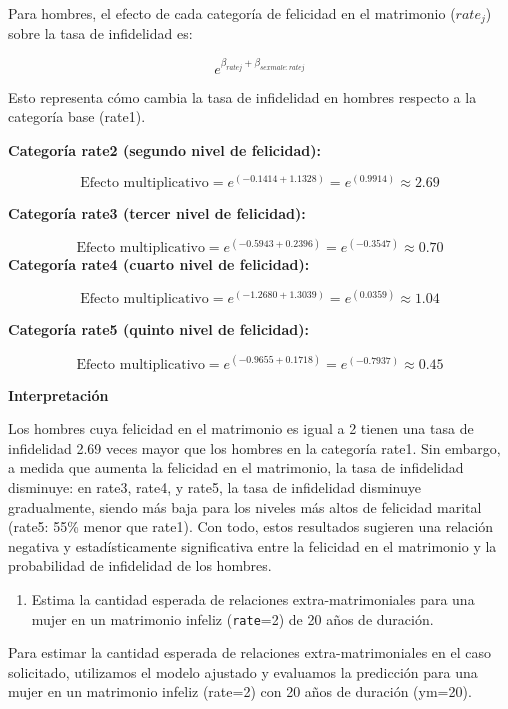 \documentclass[
  12pt,
  a4paper,
]{article}
\providecommand{\tightlist}{%
  \setlength{\itemsep}{0pt}\setlength{\parskip}{0pt}}
\begin{document}
Para hombres, el efecto de cada categoría de felicidad en el matrimonio (\(rate_j\)) sobre la tasa de infidelidad es:

\[
e^{\beta_{ratej}+\beta_{sexmale:ratej}}
\]

Esto representa cómo cambia la tasa de infidelidad en hombres respecto a la categoría base (rate1).

\textbf{Categoría rate2 (segundo nivel de felicidad):}

\[
\text{Efecto multiplicativo} = e^{(-0.1414+1.1328)} = e^{(0.9914)} \approx 2.69
\]

\textbf{Categoría rate3 (tercer nivel de felicidad):}

\[
\text{Efecto multiplicativo} = e^{(-0.5943+0.2396)} = e^{(-0.3547)} \approx 0.70
\]
\textbf{Categoría rate4 (cuarto nivel de felicidad):}

\[
\text{Efecto multiplicativo} = e^{(-1.2680+1.3039)} = e^{(0.0359)} \approx 1.04
\]

\textbf{Categoría rate5 (quinto nivel de felicidad):}

\[
\text{Efecto multiplicativo} = e^{(-0.9655+0.1718)} = e^{(-0.7937)} \approx 0.45
\]

\textbf{Interpretación}

Los hombres cuya felicidad en el matrimonio es igual a 2 tienen una tasa de infidelidad 2.69 veces mayor que los hombres en la categoría rate1. Sin embargo, a medida que aumenta la felicidad en el matrimonio, la tasa de infidelidad disminuye: en rate3, rate4, y rate5, la tasa de infidelidad disminuye gradualmente, siendo más baja para los niveles más altos de felicidad marital (rate5: 55\% menor que rate1). Con todo, estos resultados sugieren una relación negativa y estadísticamente significativa entre la felicidad en el matrimonio y la probabilidad de infidelidad de los hombres.

\begin{enumerate}
\def\labelenumi{\alph{enumi})}
\setcounter{enumi}{2}
\tightlist
\item
  Estima la cantidad esperada de relaciones extra-matrimoniales para una mujer en un matrimonio infeliz (\texttt{rate}=2) de 20 años de duración.
\end{enumerate}

Para estimar la cantidad esperada de relaciones extra-matrimoniales en el caso solicitado, utilizamos el modelo ajustado y evaluamos la predicción para una mujer en un matrimonio infeliz (rate=2) con 20 años de duración (ym=20).
\end{document}
